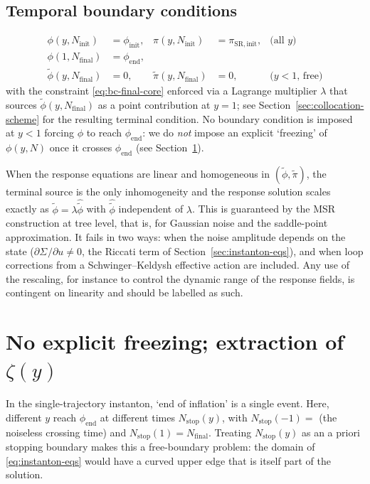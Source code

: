 \documentclass[a4paper,11pt]{article}
\newcommand{\semibold}[1]{{\fontseries{b}\selectfont{#1}}}
\newenvironment{panel}{\begin{tcolorbox}[enhanced,breakable,colback=gray!10,colframe=gray!30]\small}{\end{tcolorbox}}
\newcommand{\Ny}{N}                          %
\newcommand{\Ninit}{N_{\mathrm{init}}}       %
\newcommand{\Nfinal}{N_{\mathrm{final}}}     %
\newcommand{\field}{\phi}                    %
\newcommand{\mom}{\pi}                       %
\newcommand{\phiinit}{\field_{\mathrm{init}}}
\newcommand{\phiend}{\field_{\mathrm{end}}}
\newcommand{\rfield}{\widetilde\field}       %
\newcommand{\rmom}{\widetilde\mom}           %
\newcommand{\yco}{y}                         %
\newcommand{\Sigvol}[1]{\varSigma_{#1}}      %
\newcommand{\lag}{\lambda}                   %
\newcommand{\zprofile}{\zeta}                %
\begin{document}
\subsection{Temporal boundary conditions}

\begin{align}
    \field(\yco,\Ninit) & = \phiinit ,
    &
    \mom(\yco,\Ninit) & = \mom_{\mathrm{SR,init}} ,
    &
    \text{(all } \yco \text{)}
    \label{eq:bc-init}
    \\
    \field(1,\Nfinal) & = \phiend ,
    & & &
    \label{eq:bc-final-core}
    \\
    \rfield(\yco,\Nfinal) & = 0 ,
    &
    \rmom(\yco,\Nfinal) & = 0 ,
    &
    \text{(}\yco<1\text{, free)}
    \label{eq:bc-final-free}
\end{align}
with the constraint \eqref{eq:bc-final-core} enforced via a Lagrange
multiplier $\lag$ that sources $\rfield(\yco,\Nfinal)$ as a point
contribution at $\yco=1$; see Section~\ref{sec:collocation-scheme} for
the resulting terminal condition.
No boundary condition is imposed at $\yco<1$ forcing $\field$ to reach
$\phiend$: we do \emph{not} impose an explicit `freezing' of
$\field(\yco,\Ny)$ once it crosses $\phiend$ (see
Section~\ref{sec:zeta-extraction}).

\begin{panel}
\semibold{Linearity in $\lag$ is a tree-level property.} When the
response equations are linear and homogeneous in $(\rfield,\rmom)$, the
terminal source is the only inhomogeneity and the response solution scales
exactly as $\rfield=\lag\hat{\rfield}$ with $\hat{\rfield}$ independent of
$\lag$. This is guaranteed by the MSR construction at tree level, that
is, for Gaussian noise and the saddle-point approximation. It fails in two
ways: when the noise amplitude depends on the state
($\partial\Sigvol{}/\partial u\neq0$, the Riccati term of
Section~\ref{sec:instanton-eqs}), and when loop corrections from a
Schwinger--Keldysh effective action are included. Any use of the
rescaling, for instance to control the dynamic range of the response
fields, is contingent on linearity and should be labelled as such.
\end{panel}
\section{No explicit freezing; extraction of $\zprofile(\yco)$}
\label{sec:zeta-extraction}

In the single-trajectory instanton, `end of inflation' is a single event.
Here, different $\yco$ reach $\phiend$ at different times
$\Ny_{\mathrm{stop}}(\yco)$, with $\Ny_{\mathrm{stop}}(-1) = $ (the noiseless
crossing time) and $\Ny_{\mathrm{stop}}(1) = \Nfinal$. Treating
$\Ny_{\mathrm{stop}}(\yco)$ as an a priori stopping boundary makes this a
free-boundary problem: the domain of \eqref{eq:instanton-eqs} would have a
curved upper edge that is itself part of the solution.
\end{document}
